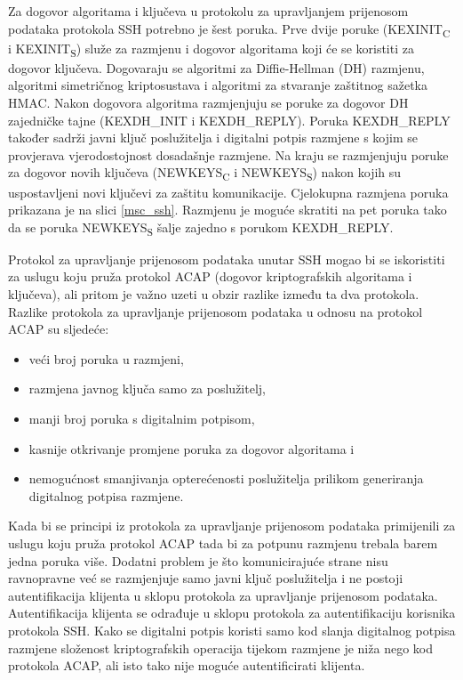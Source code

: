 Za dogovor algoritama i ključeva u protokolu za upravljanjem prijenosom podataka
protokola SSH potrebno je šest poruka.
Prve dvije poruke (KEXINIT\textsubscript{C} i
KEXINIT\textsubscript{S}) služe za razmjenu i dogovor algoritama koji će se
koristiti za dogovor ključeva. Dogovaraju se algoritmi za Diffie-Hellman (DH)
razmjenu, algoritmi simetričnog kriptosustava i algoritmi za stvaranje zaštitnog
sažetka HMAC. Nakon dogovora algoritma razmjenjuju se poruke za dogovor
DH zajedničke tajne (KEXDH\_INIT i KEXDH\_REPLY). Poruka KEXDH\_REPLY također
sadrži javni ključ poslužitelja i digitalni potpis razmjene s kojim se
provjerava vjerodostojnost dosadašnje razmjene. Na kraju se razmjenjuju
poruke za dogovor novih ključeva (NEWKEYS\textsubscript{C} i
NEWKEYS\textsubscript{S}) nakon kojih su uspostavljeni novi ključevi za zaštitu
komunikacije. Cjelokupna razmjena poruka prikazana je na slici \ref{msc_ssh}.
Razmjenu je moguće skratiti na pet poruka tako da se poruka
NEWKEYS\textsubscript{S} šalje zajedno s porukom KEXDH\_REPLY.


Protokol za upravljanje prijenosom podataka unutar SSH mogao bi se iskoristiti
za uslugu koju pruža protokol ACAP (dogovor kriptografskih algoritama i
ključeva), ali
pritom je važno uzeti u obzir razlike između ta dva protokola. Razlike protokola
za upravljanje prijenosom podataka u odnosu na protokol ACAP su sljedeće:
\begin{itemize}
    \item veći broj poruka u razmjeni,
    \item razmjena javnog ključa samo za poslužitelj,
    \item manji broj poruka s digitalnim potpisom,
    \item kasnije otkrivanje promjene poruka za dogovor algoritama i
    \item nemogućnost smanjivanja opterećenosti poslužitelja prilikom
	generiranja digitalnog potpisa razmjene.
\end{itemize}



Kada bi se principi iz protokola za upravljanje prijenosom podataka primijenili
za uslugu koju pruža protokol ACAP tada bi za potpunu razmjenu trebala barem
jedna poruka više. Dodatni problem je što komunicirajuće strane nisu ravnopravne
već se razmjenjuje samo javni ključ poslužitelja i ne postoji autentifikacija
klijenta u sklopu protokola za upravljanje prijenosom podataka. Autentifikacija
klijenta se odrađuje u sklopu protokola za autentifikaciju korisnika protokola
SSH. Kako se digitalni potpis koristi samo kod slanja digitalnog potpisa
razmjene složenost kriptografskih operacija tijekom razmjene je niža nego kod
protokola ACAP, ali isto tako nije moguće autentificirati klijenta.

